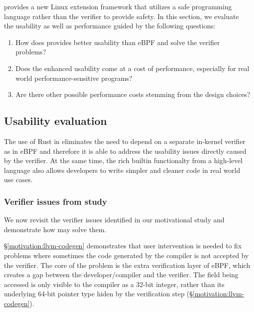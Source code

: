 \projname{} provides a new Linux extension framework that utilizes a safe
    programming language rather than the verifier to provide safety.
In this section, we evaluate the usability as well as performance guided by the
    following questions:
\begin{enumerate}
    \item How does \projname{} provides better usability than eBPF and solve the
        verifier problems?
    \item Does the enhanced usability come at a cost of performance, especially
        for real world performance-sensitive programs?
    \item Are there other possible performance costs stemming from the design
        choices?
\end{enumerate}

\subsection{Usability evaluation}
The use of Rust in \projname{} eliminates the need to depend on a separate
    in-kernel verifier as in eBPF and therefore it is able to address the
    usability issues directly caused by the verifier.
At the same time, the rich builtin functionalty from a high-level language also
    allows developers to write simpler and cleaner code in real world use cases.

\subsubsection{Verifier issues from study}
We now revisit the verifier issues identified in our motivational study and
    demonstrate how \projname{} may solve them.

 \S\ref{motivation:llvm-codegen} demonstrates that
    user intervention is needed to fix problems where sometimes the code generated
    by the compiler is not accepted by the verifier.
The core of the problem is the extra verification layer of eBPF, which creates
    a gap between the developer/compiler and the verifier.
The field being accessed is only visible to the compiler as a 32-bit integer,
    rather than its underlying 64-bit pointer type hiden by the verification
    step (\S\ref{motivation:llvm-codegen}).

